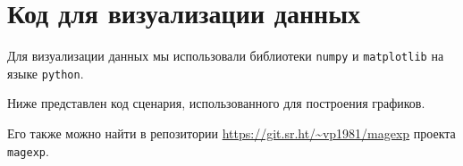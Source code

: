 \section{Код для визуализации данных}
\label{app:code-python-vis}

Для визуализации данных мы использовали библиотеки \texttt{numpy} и
\texttt{matplotlib} на языке \texttt{python}.

Ниже представлен код сценария, использованного для построения графиков.

Его также можно найти в репозитории \url{https://git.sr.ht/~vp1981/magexp}
проекта \texttt{magexp}.

\inputminted[linenos,breaklines,fontsize=\scriptsize]{python}{stat-prop_v2.py}

